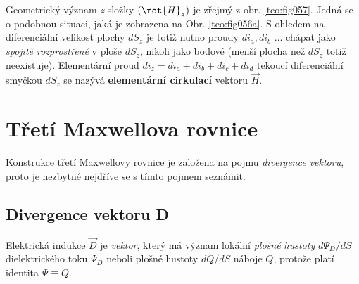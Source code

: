 
      Geometrický význam \emph{z}-složky \((\rot{H}_z)\) je zřejmý z obr. \ref{teo:fig057}. Jedná se
      o podobnou situaci, jaká je zobrazena na Obr. \ref{teo:fig056a}. S ohledem na diferenciální
      velikost plochy \(dS_z\) je totiž nutno proudy \(di_a, di_b\) ... chápat jako \emph{spojitě
      rozprostřené} v ploše \(dS_z\), nikoli jako bodové (menší plocha než \(dS_z\) totiž
      neexistuje). Elementární proud \(di_z = di_a + di_b + di_c + di_d\) tekoucí diferenciální
      smyčkou \(dS_z\) se nazývá \textbf{ elementární cirkulací} vektoru \(\vec{H}\).

  \section{Třetí Maxwellova rovnice}\label{ES:sec08}
    Konstrukce třetí Maxwellovy rovnice je založena na pojmu \emph{divergence vektoru}, proto je 
    nezbytné nejdříve se s tímto pojmem seznámit.
    
    \subsection{Divergence vektoru D}\label{ES:ssec01}
      Elektrická indukce \(\vec{D}\) je \emph{vektor}, který má význam lokální \emph{plošné 
      hustoty} \(d\Psi_D/dS\) dielektrického toku \(\Psi_D\) neboli plošné hustoty \(dQ/dS\) náboje 
      \(Q\), protože platí identita \(\Psi\equiv Q\).
      
